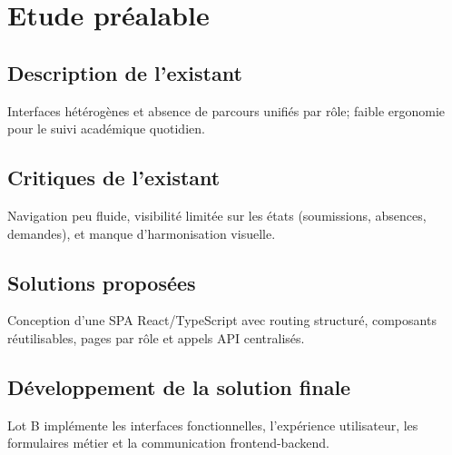 \chapter{Etude préalable}

\section{Description de l'existant}
Interfaces hétérogènes et absence de parcours unifiés par rôle; faible ergonomie pour le suivi académique quotidien.

\section{Critiques de l'existant}
Navigation peu fluide, visibilité limitée sur les états (soumissions, absences, demandes), et manque d'harmonisation visuelle.

\section{Solutions proposées}
Conception d'une SPA React/TypeScript avec routing structuré, composants réutilisables, pages par rôle et appels API centralisés.

\section{Développement de la solution finale}
Lot B implémente les interfaces fonctionnelles, l'expérience utilisateur, les formulaires métier et la communication frontend-backend.
